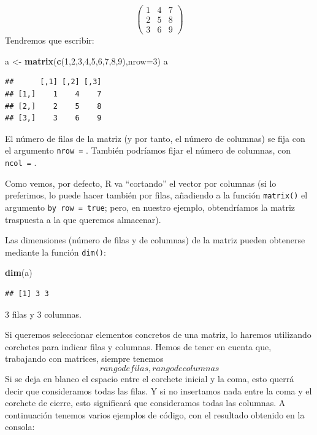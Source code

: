 \documentclass[
]{book}
\newenvironment{Shaded}{\begin{snugshade}}{\end{snugshade}}
\newcommand{\AttributeTok}[1]{\textcolor[rgb]{0.13,0.29,0.53}{#1}}
\newcommand{\DecValTok}[1]{\textcolor[rgb]{0.00,0.00,0.81}{#1}}
\newcommand{\FunctionTok}[1]{\textcolor[rgb]{0.13,0.29,0.53}{\textbf{#1}}}
\newcommand{\NormalTok}[1]{#1}
\newcommand{\OtherTok}[1]{\textcolor[rgb]{0.56,0.35,0.01}{#1}}
\begin{document}
\[
\begin{pmatrix}
    1 & 4 & 7 \\
    2 & 5 & 8 \\
    3 & 6 & 9
\end{pmatrix}
\] Tendremos que escribir:

\begin{Shaded}
\begin{Highlighting}[]
\NormalTok{a }\OtherTok{\textless{}{-}} \FunctionTok{matrix}\NormalTok{(}\FunctionTok{c}\NormalTok{(}\DecValTok{1}\NormalTok{,}\DecValTok{2}\NormalTok{,}\DecValTok{3}\NormalTok{,}\DecValTok{4}\NormalTok{,}\DecValTok{5}\NormalTok{,}\DecValTok{6}\NormalTok{,}\DecValTok{7}\NormalTok{,}\DecValTok{8}\NormalTok{,}\DecValTok{9}\NormalTok{),}\AttributeTok{nrow=}\DecValTok{3}\NormalTok{)}
\NormalTok{a}
\end{Highlighting}
\end{Shaded}

\begin{verbatim}
##      [,1] [,2] [,3]
## [1,]    1    4    7
## [2,]    2    5    8
## [3,]    3    6    9
\end{verbatim}

El número de filas de la matriz (y por tanto, el número de columnas) se fija con el argumento \texttt{nrow\ =} . También podríamos fijar el número de columnas, con \texttt{ncol\ =} .

Como vemos, por defecto, R va ``cortando'' el vector por columnas (si lo preferimos, lo puede hacer también por filas, añadiendo a la función \texttt{matrix()} el argumento \texttt{by\ row\ =\ true}; pero, en nuestro ejemplo, obtendríamos la matriz traspuesta a la que queremos almacenar).

Las dimensiones (número de filas y de columnas) de la matriz pueden obtenerse mediante la función \texttt{dim()}:

\begin{Shaded}
\begin{Highlighting}[]
\FunctionTok{dim}\NormalTok{(a)}
\end{Highlighting}
\end{Shaded}

\begin{verbatim}
## [1] 3 3
\end{verbatim}

3 filas y 3 columnas.

Si queremos seleccionar elementos concretos de una matriz, lo haremos utilizando corchetes para indicar filas y columnas. Hemos de tener en cuenta que, trabajando con matrices, siempre tenemos \[rango de filas, rango de columnas\] Si se deja en blanco el espacio entre el corchete inicial y la coma, esto querrá decir que consideramos todas las filas. Y si no insertamos nada entre la coma y el corchete de cierre, esto significará que consideramos todas las columnas. A continuación tenemos varios ejemplos de código, con el resultado obtenido en la consola:
\end{document}
